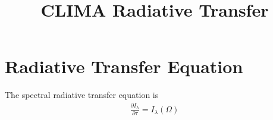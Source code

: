 \documentclass{report}
\title{CLIMA Radiative Transfer}
\author{ }
\newcommand{\PD}{\partial}
\newcommand{\IL}{I_{\lambda}}
\begin{document}
\maketitle
\tableofcontents

\chapter{Radiative Transfer Equation}
The spectral radiative transfer equation is
\begin{equation}\begin{aligned}
\frac{\PD \IL}{\PD \tau} = \IL(\Omega)
\end{aligned}\end{equation}




\end{document}
